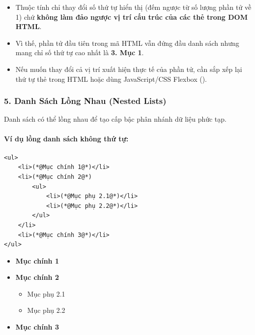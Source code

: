 \begin{noteBox}
\begin{itemize}[leftmargin=1.5em, itemsep=3pt, parsep=0pt]
    \item Thuộc tính  chỉ thay đổi số thứ tự hiển thị (đếm ngược từ số lượng phần tử về 1) chứ \textbf{không làm đảo ngược vị trí cấu trúc của các thẻ  trong DOM HTML}.
    \item Vì thế, phần tử đầu tiên trong mã HTML  vẫn đứng đầu danh sách nhưng mang chỉ số thứ tự cao nhất là \textbf{3. Mục 1}.
    \item Nếu muốn thay đổi cả vị trí xuất hiện thực tế của phần tử, cần sắp xếp lại thứ tự thẻ trong HTML hoặc dùng JavaScript/CSS Flexbox ().
\end{itemize}
\end{noteBox}

\subsubsection{5. Danh Sách Lồng Nhau (Nested Lists)}

Danh sách có thể lồng nhau để tạo cấp bậc phân nhánh dữ liệu phức tạp.

\paragraph{Ví dụ lồng danh sách không thứ tự:}
\begin{codeWindow}
\begin{lstlisting}[language=HTML5]
<ul>
    <li>(*@Mục chính 1@*)</li>
    <li>(*@Mục chính 2@*)
        <ul>
            <li>(*@Mục phụ 2.1@*)</li>
            <li>(*@Mục phụ 2.2@*)</li>
        </ul>
    </li>
    <li>(*@Mục chính 3@*)</li>
</ul>
\end{lstlisting}
\end{codeWindow}

\begin{browserWindow}
\begin{itemize}[leftmargin=1.5em, itemsep=3pt, parsep=0pt]
    \item \textbf{Mục chính 1}
    \item \textbf{Mục chính 2}
    \begin{itemize}[leftmargin=1.5em, itemsep=2pt, parsep=0pt]
        \item Mục phụ 2.1
        \item Mục phụ 2.2
    \end{itemize}
    \item \textbf{Mục chính 3}
\end{itemize}
\end{browserWindow}

